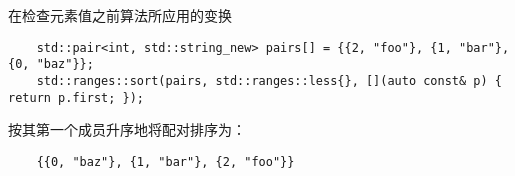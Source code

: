 在检查元素值之前算法所应用的变换

\begin{example}
  \begin{lstlisting}
    std::pair<int, std::string_new> pairs[] = {{2, "foo"}, {1, "bar"}, {0, "baz"}};
    std::ranges::sort(pairs, std::ranges::less{}, [](auto const& p) { return p.first; });
  \end{lstlisting}
  按其第一个成员升序地将配对排序为：
  \begin{lstlisting}
    {{0, "baz"}, {1, "bar"}, {2, "foo"}}
  \end{lstlisting}
\end{example}
